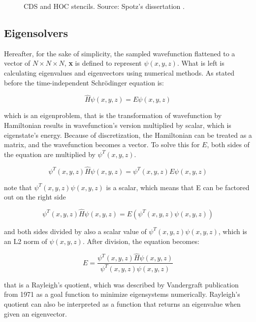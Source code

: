 \begin{figure}[t]
	\caption{CDS and HOC stencils. Source: Spotz's dissertation \cite{spotz1996hoc}.}
	\label{fig:stencils}
\end{figure}

\subsection{Eigensolvers}
Hereafter, for the sake of simplicity, the sampled wavefunction flattened to a vector of $N \times N \times N$, \textbf{x} is defined to represent $\psi(x,y,z)$. What is left is calculating eigenvalues and eigenvectors using numerical methods. As stated before the time-independent Schr{\"o}dinger equation is:

\begin{equation}
	\hat{H} \psi(x,y,z) = E \psi(x,y,z)
\end{equation}

\noindent which is an eigenproblem, that is the transformation of wavefunction by Hamiltonian results in wavefunction's version multiplied by scalar, which is eigenstate's energy. Because of discretization, the Hamiltonian can be treated as a matrix, and the wavefunction becomes a vector. To solve this for $E$, both sides of the equation are multiplied by $\psi^T(x,y,z).$

\begin{equation}
	\psi^T(x,y,z) \hat{H} \psi(x,y,z) = \psi^T(x,y,z) E \psi(x,y,z)
\end{equation}

\noindent note that $\psi^T(x,y,z)\psi(x,y,z)$ is a scalar, which means that E can be factored out on the right side

\begin{equation}
	\psi^T(x,y,z) \hat{H} \psi(x,y,z) = E(\psi^T(x,y,z) \psi(x,y,z))
\end{equation}

\noindent and both sides divided by also a scalar value of $\psi^T(x,y,z) \psi(x,y,z)$, which is an L2 norm of $\psi(x,y,z)$. After division, the equation becomes:

\begin{equation}
	E = \frac{\psi^T(x,y,z) \hat{H} \psi(x,y,z)}{\psi^T(x,y,z) \psi(x,y,z)}
\end{equation}

\noindent that is a Rayleigh's quotient, which was described by Vandergraft \cite{vandergraft1971} publication from 1971 as a goal function to minimize eigensystems numerically. Rayleigh's quotient can also be interpreted as a function that returns an eigenvalue when given an eigenvector.

